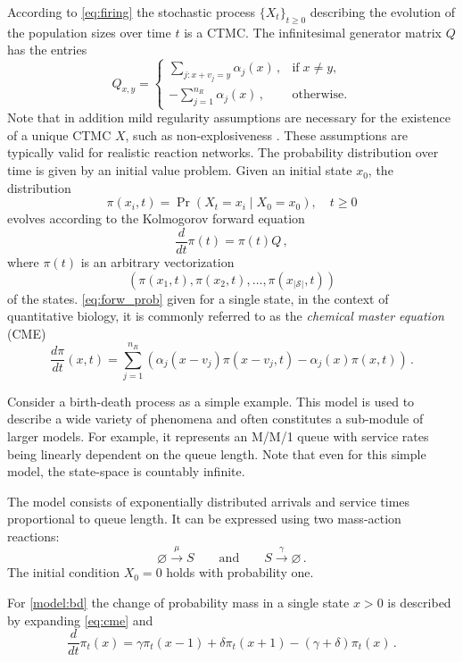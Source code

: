According to \eqref{eq:firing} the stochastic
process $\{{{X}}_t\}_{t\geq 0}$ describing the evolution of the population
sizes over time $t$ is a \acf{CTMC}.
The infinitesimal  generator matrix $Q$ has the entries
\begin{equation}\label{eq:cme_generator}
    Q_{ x,  y} = \begin{cases}
        \sum_{j: x+ v_j = y}\alpha_j( x)\,,&\text{if}\; x\neq
         y,\\[1ex]
        -\sum_{j=1}^{n_R} \alpha_j( x)\,, &\text{otherwise.}
    \end{cases}
\end{equation}
Note that in addition mild regularity assumptions
are   necessary for the existence of a unique \ac{CTMC} $X$, such as non-explosiveness \cite{anderson2012continuous}.
These assumptions  are  typically
valid for realistic reaction networks.
The probability distribution over time is given by an
initial value problem.
Given an initial state $x_0$, the distribution
\begin{equation}\label{eq:forw_prob}
\pi(x_i, t)=\Pr(X_t=x_i\mid X_0=x_0),\quad t\geq 0
\end{equation}
evolves according to the Kolmogorov forward equation
\begin{equation}\label{eq:forward}
\frac{d}{dt}\pi(t) = \pi(t) Q\,,
\end{equation}
where $\pi(t)$ is an arbitrary vectorization $$(\pi(x_1,t), \pi(x_2,t),\dots,\pi(x_{|\mathcal{S}|},t))$$ of the states.
\eqref{eq:forw_prob} given for a single state, in the context of quantitative biology, it is commonly referred to
as the \emph{chemical master equation} (CME)
\begin{equation}\label{eq:cme}
    \frac{d\pi}{d t} ( x,t) =
    \sum_{j=1}^{n_R}\left(
        \alpha_j( x- v_j)\pi( x- v_j,t) - \alpha_j( x)\pi( x,t)
    \right)\,.
\end{equation}

\begin{example} Consider a birth-death process as a simple example. This model is used to describe a wide variety of phenomena and often constitutes a sub-module of larger models.
For example, it represents an M/M/1 queue with service rates being linearly dependent on the queue length.
Note that even for this simple model, the state-space is countably infinite.
\begin{model}\label{model:bd}
The model consists of exponentially distributed arrivals and service times proportional to queue length. It can be expressed using two mass-action reactions:
$$ \varnothing \xrightarrow{\mu} S \qquad\text{and}\qquad S \xrightarrow{\gamma} \varnothing\,.$$
The initial condition $X_0=0$ holds with probability one.
\end{model}

For \autoref{model:bd} the change of probability mass in a single state $x>0$ is described by expanding
\eqref{eq:cme} and
$$\frac{d}{dt}\pi_t(x)=\gamma \pi_t(x-1) + \delta \pi_t(x+1) - (\gamma + \delta)\pi_t(x)\,.$$
\end{example}


